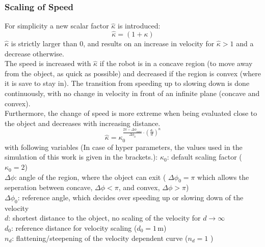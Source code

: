\subsubsection{Scaling of Speed}
For simplicity a new scalar factor $\hat \kappa$ is introduced:
\begin{equation}
\hat \kappa = ( 1+ \kappa )
\end{equation}
$\hat \kappa$ is strictly larger than 0, and results on an increase in velocity for $\hat \kappa > 1 $ and a decrease otherwise.
\\
The speed is increased with $\hat \kappa$ if the robot is in a concave region (to move away from the object, as quick as possible) and decreased if the region is convex (where it is save to stay in). The transition from speeding up to slowing down is done continuously, with no change in velocity in front of an infinite plane (concave and convex). \\
Furthermore, the change of speed is more extreme when being evaluated close to the object and decreases with increasing distance.\\
\begin{equation}
\hat \kappa = \kappa_0 ^{\frac{2 \pi - \Delta \phi_{conv}}{\Delta \phi_0} \cdot \left(\frac{d_0}{d}\right)^n}
\end{equation}
with following variables (In case of hyper parameters, the values used in the simulation of this work is given in the brackets.):
$\kappa_0$: default scaling factor ($\kappa_0 = 2$)\\
$\Delta \phi$:  angle of the region, where the object can exit ( $\Delta \phi_0 = \pi$ which allows the seperation between concave, $\Delta \phi < \pi $, and convex, $\Delta \phi > \pi$) \\
$\Delta \phi_0$: reference angle, which decides over speeding up or slowing down of the velocity \\
$d$: shortest distance to the object, no scaling of the velocity for $d \rightarrow \infty$ \\
$d_0$: reference distance for velocity scaling ($d_0 = 1 \,\mathrm{m}$) \\
$n_d$: flattening/steepening of the velocity dependent curve  ($n_d = 1$ ) \\

